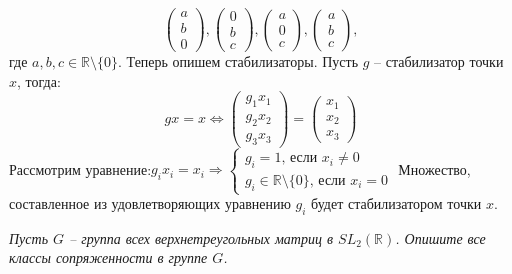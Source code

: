 \documentclass[a4paper, 12pt]{article}
\newcommand{\R}{\mathbb{R}}
\newcommand{\x}{\times}
\begin{document}
\begin{spacing}{1}
$$\begin{pmatrix}
a\\b\\0
\end{pmatrix},
\begin{pmatrix}
0\\b\\c
\end{pmatrix},
\begin{pmatrix}
a\\0\\c
\end{pmatrix},
\begin{pmatrix}
a\\b\\c
\end{pmatrix},
$$ где $a,b,c \in \R\setminus\{0\}.$ Теперь опишем стабилизаторы. Пусть $g$ -- стабилизатор точки $x$, тогда:
$$gx=x\Leftrightarrow \begin{pmatrix}
g_1x_1\\g_2x_2\\g_3x_3
\end{pmatrix} = \begin{pmatrix}
x_1\\x_2\\x_3
\end{pmatrix}$$
Рассмотрим уравнение:$g_ix_i=x_i \Rightarrow \begin{cases}
g_i = 1\text{, если } x_i \neq 0\\
g_i \in \R\setminus\{0\}\text{, если }x_i = 0
\end{cases}$ Множество, составленное из удовлетворяющих уравнению $g_i$ будет стабилизатором точки $x$.
\newpage
\begin{center}
\end{center}

\noindent \textit{Пусть $G$ -- группа всех верхнетреугольных матриц в $SL_2(\R)$. Опишите все классы сопряженности в группе $G$.}


\end{spacing}
\end{document}
